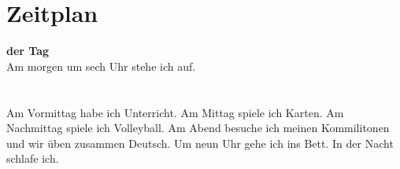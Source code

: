 \section{Zeitplan}
\textbf{der Tag} \\
\noindent
Am morgen um sech Uhr stehe ich auf.  \\
\\
\\
\noindent
Am Vormittag habe ich Unterricht. Am Mittag spiele ich Karten. Am Nachmittag spiele ich Volleyball. Am Abend besuche ich meinen Kommilitonen  und wir üben zusammen Deutsch. Um neun Uhr gehe ich ins Bett. In der Nacht schlafe ich. 

